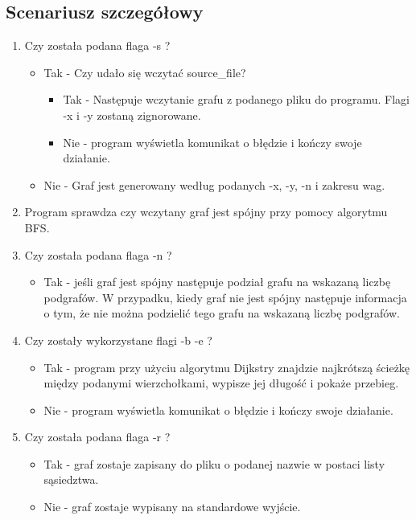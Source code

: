 \documentclass{article}
\begin{document}
\subsection{Scenariusz szczegółowy}
\begin{enumerate}

\item Czy została podana flaga -s ?
    \begin{itemize}
        \item Tak - Czy udało się wczytać source\_file?
        \begin{itemize}
            \item Tak - Następuje wczytanie grafu z podanego pliku do programu. Flagi -x i -y zostaną zignorowane.
            \item Nie - program wyświetla komunikat o błędzie i kończy swoje działanie.
        \end{itemize}
        \item Nie - Graf jest generowany według podanych -x, -y, -n i zakresu wag.
    \end{itemize}
    
\item Program sprawdza czy wczytany graf jest spójny przy pomocy algorytmu BFS.

\item Czy została podana flaga -n ?
    \begin{itemize}
        \item Tak - jeśli graf jest spójny następuje podział grafu na wskazaną liczbę podgrafów. W przypadku, kiedy graf nie jest spójny następuje informacja o tym, że nie można podzielić tego grafu na wskazaną liczbę podgrafów.
    \end{itemize}

\item Czy zostały wykorzystane flagi -b -e ?
    \begin{itemize}
        \item Tak - program przy użyciu algorytmu Dijkstry znajdzie najkrótszą ścieżkę między podanymi wierzchołkami, wypisze jej długość i pokaże przebieg.
        \item Nie - program wyświetla komunikat o błędzie i kończy swoje działanie.
    \end{itemize}

\item Czy została podana flaga -r ?
    \begin{itemize}
        \item Tak - graf zostaje zapisany do pliku o podanej nazwie w postaci listy sąsiedztwa.
        \item Nie - graf zostaje wypisany na standardowe wyjście.
    \end{itemize}
    
\end{enumerate}
\end{document}
